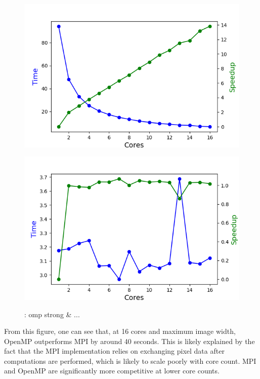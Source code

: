 \begin{figure}[h]
\begin{minipage}{0.45\linewidth}
      \includegraphics[width=\linewidth]{figs/mpi_strong.out}
      \caption{}
      \label{fig:mpi_strong}
    \end{minipage}
  \hspace{.05\linewidth}
 \begin{minipage}{0.45\linewidth}
  \includegraphics[width=\linewidth]{figs/omp_strong.out}
 \caption{: omp strong \& ...}
    \label{fig:omp_strong}
    \end{minipage}
\end{figure}

From this figure, one can see that, at 16 cores and maximum image width, OpenMP outperforms MPI by around 40 seconds. This is likely explained by the fact that the MPI implementation relies on exchanging pixel data after computations are performed, which is likely to scale poorly with core count. MPI and OpenMP are significantly more competitive at lower core counts.


